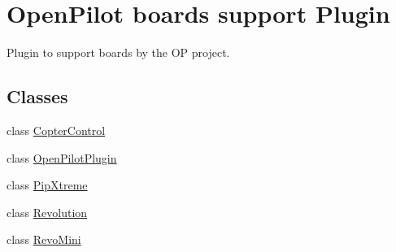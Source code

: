 \hypertarget{group___boards___open_pilot_plugin}{\section{\-Open\-Pilot boards support \-Plugin}
\label{group___boards___open_pilot_plugin}
}


\-Plugin to support boards by the \-O\-P project.  


\subsection*{\-Classes}
\begin{DoxyCompactItemize}
\item 
class \hyperlink{class_copter_control}{\-Copter\-Control}
\item 
class \hyperlink{class_open_pilot_plugin}{\-Open\-Pilot\-Plugin}
\item 
class \hyperlink{class_pip_xtreme}{\-Pip\-Xtreme}
\item 
class \hyperlink{class_revolution}{\-Revolution}
\item 
class \hyperlink{class_revo_mini}{\-Revo\-Mini}
\end{DoxyCompactItemize}
